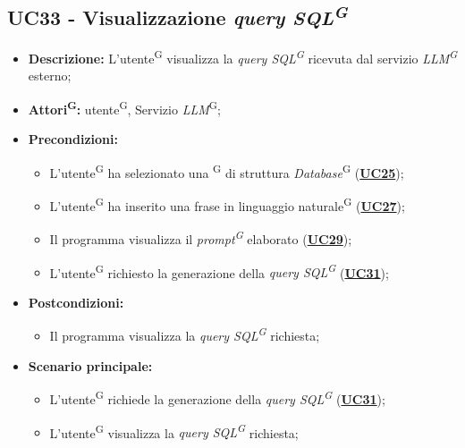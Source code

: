 \subsection{UC33 - Visualizzazione \textit{query SQL\textsuperscript{G}}}
\label{sec:UC33}
\begin{itemize}
	\item \textbf{Descrizione:} L’utente\textsuperscript{G} visualizza la \textit{query SQL\textsuperscript{G}} ricevuta dal servizio \textit{LLM\textsuperscript{G}} esterno;
	\item \textbf{Attori\textsuperscript{G}:} utente\textsuperscript{G}, Servizio \textit{LLM}\textsuperscript{G};
	\item \textbf{Precondizioni:} 
	\begin{itemize}
		\item L’utente\textsuperscript{G} ha selezionato una \textsuperscript{G} di struttura \textit{Database}\textsuperscript{G} (\hyperref[sec:UC25]{\textbf{UC25}});
		\item L’utente\textsuperscript{G} ha inserito una frase in linguaggio naturale\textsuperscript{G} (\hyperref[sec:UC27]{\textbf{UC27}});
		\item Il programma visualizza il \textit{prompt\textsuperscript{G}} elaborato (\hyperref[sec:UC29]{\textbf{UC29}});
		\item L’utente\textsuperscript{G} richiesto la generazione della \textit{query SQL\textsuperscript{G}} (\hyperref[sec:UC31]{\textbf{UC31}});
	\end{itemize}
	\item \textbf{Postcondizioni:} 
	\begin{itemize}
		\item Il programma visualizza la \textit{query SQL\textsuperscript{G}} richiesta;
	\end{itemize}
	\item \textbf{Scenario principale:} 
	\begin{itemize}
		\item L'utente\textsuperscript{G} richiede la generazione della \textit{query SQL\textsuperscript{G}} (\hyperref[sec:UC31]{\textbf{UC31}});
		\item L'utente\textsuperscript{G} visualizza la \textit{query SQL\textsuperscript{G}} richiesta;
	\end{itemize}
\end{itemize}
